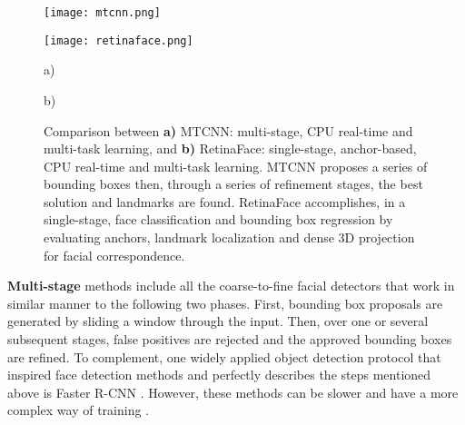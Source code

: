 \documentclass[class=report, crop=false, a4paper, 12pt]{standalone}
\begin{document}
\vspace{0.5\baselineskip}
\begin{figure}[h!]
    \centering
    \begin{minipage}[c]{0.38\textwidth}
      \centering
      \texttt{[image: mtcnn.png]}
      \label{fig:mtcnn}
    \end{minipage}
    \hspace{0.5cm}
    \begin{minipage}[c]{0.52\textwidth}
      \centering
      \texttt{[image: retinaface.png]}
      \label{fig:retinaface}
    \end{minipage} 
    \begin{minipage}{0.4\textwidth}
        \vspace{-0.5cm}
        \centering
        \footnotesize a)
    \end{minipage}
    \hfill
    \begin{minipage}{0.4\textwidth}
        \vspace{-0.5cm}
        \centering
        \footnotesize b)
    \end{minipage}
    \vspace{-0.4cm}
    \caption{Comparison between \textbf{a)} MTCNN: multi-stage, CPU real-time and multi-task learning, and \textbf{b)} RetinaFace: single-stage, anchor-based, CPU real-time and multi-task learning. MTCNN \autocite{zhangJointFaceDetection2016a} proposes a series of bounding boxes then, through a series of refinement stages, the best solution and landmarks are found. RetinaFace \autocite{dengRetinaFaceSinglestageDense2019} accomplishes, in a single-stage, face classification and bounding box regression by evaluating anchors, landmark localization and dense 3D projection for facial correspondence.}
    \label{fig:mtcnn vs retinaface}
\end{figure}
  

\par \noindent \textbf{Multi-stage} methods \autocite{dengRetinaFaceSinglestageDense2019} include all the coarse-to-fine facial detectors that work in similar manner to the following two phases. First, bounding box proposals are generated by sliding a window through the input. Then, over one or several subsequent stages, false positives are rejected and the approved bounding boxes are refined. To complement, one widely applied object detection protocol that inspired face detection methods and perfectly describes the steps mentioned above is Faster R-CNN \autocite{renFasterRCNNRealTime2016}. However, these methods can be slower and have a more complex way of training \autocite{xuCenterFaceJointFace2019}.
\end{document}
